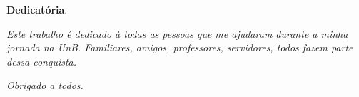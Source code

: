 \begin{dedicatoria}
	\vspace*{\fill}
	\centering
	\noindent

	\textbf{Dedicatória}.
	
	\textit{Este trabalho é dedicado à todas as pessoas que me ajudaram durante a minha jornada na UnB. Familiares, amigos, professores, servidores, todos fazem parte dessa conquista.} 
	
	\textit{Obrigado a todos.}
	
	\vspace*{\fill}
\end{dedicatoria}

\begin{comment}




\end{comment}
